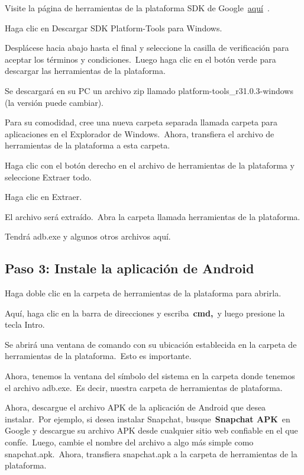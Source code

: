 \documentclass[
  a4paper,
]{article}
\begin{document}
Visite la página de herramientas de la plataforma SDK de
Google~\href{https://developer.android.com/studio/releases/platform-tools.html}{aquí}~.

Haga clic en Descargar SDK Platform-Tools para Windows.

Desplácese hacia abajo hasta el final y seleccione la casilla de
verificación para aceptar los términos y condiciones.~Luego haga clic en
el botón verde para descargar las herramientas de la plataforma.

Se descargará en su PC un archivo zip llamado
platform-tools\_r31.0.3-windows (la versión puede cambiar).

Para su comodidad, cree una nueva carpeta separada llamada carpeta para
aplicaciones en el Explorador de Windows.~Ahora, transfiera el archivo
de herramientas de la plataforma a esta carpeta.

Haga clic con el botón derecho en el archivo de herramientas de la
plataforma y seleccione Extraer todo.

Haga clic en Extraer.

El archivo será extraído.~Abra la carpeta llamada herramientas de la
plataforma.

Tendrá adb.exe y algunos otros archivos aquí.

\hypertarget{paso-3-instale-la-aplicaciuxf3n-de-android}{%
\subsection{Paso 3: Instale la aplicación de
Android}\label{paso-3-instale-la-aplicaciuxf3n-de-android}}

Haga doble clic en la carpeta de herramientas de la plataforma para
abrirla.

Aquí, haga clic en la barra de direcciones y escriba~\textbf{cmd,}~y
luego presione la tecla Intro.

Se abrirá una ventana de comando con su ubicación establecida en la
carpeta de herramientas de la plataforma.~Esto es importante.

Ahora, tenemos la ventana del símbolo del sistema en la carpeta donde
tenemos el archivo adb.exe.~Es decir, nuestra carpeta de herramientas de
plataforma.

Ahora, descargue el archivo APK de la aplicación de Android que desea
instalar.~Por ejemplo, si desea instalar Snapchat,
busque~\textbf{Snapchat APK}~en Google y descargue su archivo APK desde
cualquier sitio web confiable en el que confíe.~Luego, cambie el nombre
del archivo a algo más simple como snapchat.apk.~Ahora, transfiera
snapchat.apk a la carpeta de herramientas de la plataforma.
\end{document}
